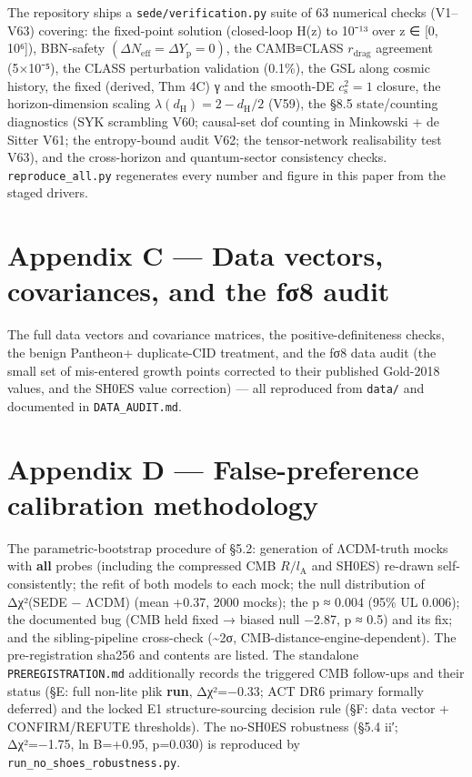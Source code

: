 \documentclass[
  10pt,
]{article}
\begin{document}
The repository ships a \texttt{sede/verification.py} suite of 63
numerical checks (V1--V63) covering: the fixed-point solution
(closed-loop H(z) to 10⁻¹³ over z ∈ {[}0, 10⁶{]}), BBN-safety
\((\Delta N_{\mathrm{eff}} = \Delta Y_{\mathrm{p}} = 0)\), the
CAMB≡CLASS \(r_{\mathrm{drag}}\) agreement (5×10⁻⁵), the CLASS
perturbation validation (0.1\%), the GSL along cosmic history, the fixed
(derived, Thm 4C) γ and the smooth-DE \(c_{\mathrm{s}}^{2} = 1\)
closure, the horizon-dimension scaling
\(\lambda (d_{\mathrm{H}}) = 2 - d_{\mathrm{H}}/2\) (V59), the §8.5
state/counting diagnostics (SYK scrambling V60; causal-set dof counting
in Minkowski + de Sitter V61; the entropy-bound audit V62; the
tensor-network realisability test V63), and the cross-horizon and
quantum-sector consistency checks. \texttt{reproduce\_all.py}
regenerates every number and figure in this paper from the staged
drivers.

\section{Appendix C --- Data vectors, covariances, and the fσ8
audit}\label{appendix-c-data-vectors-covariances-and-the-fux3c38-audit}

The full data vectors and covariance matrices, the positive-definiteness
checks, the benign Pantheon+ duplicate-CID treatment, and the fσ8 data
audit (the small set of mis-entered growth points corrected to their
published Gold-2018 values, and the SH0ES value correction) --- all
reproduced from \texttt{data/} and documented in
\texttt{DATA\_AUDIT.md}.

\section{Appendix D --- False-preference calibration
methodology}\label{appendix-d-false-preference-calibration-methodology}

The parametric-bootstrap procedure of §5.2: generation of ΛCDM-truth
mocks with \textbf{all} probes (including the compressed CMB
\(R/l_{\mathrm{A}}\) and SH0ES) re-drawn self-consistently; the refit of
both models to each mock; the null distribution of Δχ²(SEDE − ΛCDM)
(mean +0.37, 2000 mocks); the p ≈ 0.004 (95\% UL 0.006); the documented
bug (CMB held fixed → biased null −2.87, p ≈ 0.5) and its fix; and the
sibling-pipeline cross-check (\textasciitilde2σ,
CMB-distance-engine-dependent). The pre-registration sha256 and contents
are listed. The standalone \texttt{PREREGISTRATION.md} additionally
records the triggered CMB follow-ups and their status (§E: full non-lite
plik \textbf{run}, Δχ²=−0.33; ACT DR6 primary formally deferred) and the
locked E1 structure-sourcing decision rule (§F: data vector +
CONFIRM/REFUTE thresholds). The no-SH0ES robustness (§5.4 ii′;
Δχ²=−1.75, ln B=+0.95, p=0.030) is reproduced by
\texttt{run\_no\_shoes\_robustness.py}.
\end{document}
